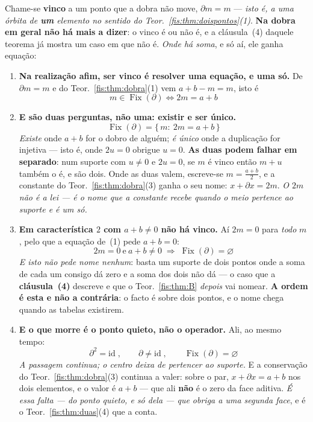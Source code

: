 \documentclass[livro.tex]{subfiles}
\begin{document}
\begin{teorema}\label{fis:thm:vinco}
Chame-se \textbf{vinco} a um ponto que a dobra não move, $\partial m=m$ ---
\emph{isto é, a uma órbita de \textbf{um} elemento no sentido do
Teor.~\ref{fis:thm:doispontos}(1)}. \textbf{Na dobra em geral não há mais a
dizer}: o vinco é ou não é, e a cláusula~(4) daquele teorema já mostra um caso em
que não é. \emph{Onde há soma}, e só aí, ele ganha equação:
\begin{enumerate}\itemsep3pt
\item[(1)] \textbf{Na realização afim, ser vinco é resolver uma equação, e uma
só.} De $\partial m=m$ e do Teor.~\ref{fis:thm:dobra}(1) vem $a+b-m=m$, isto é
\[
\boxed{\;m\in\operatorname{Fix}(\partial)\iff 2m=a+b\;}
\]
\item[(2)] \textbf{E são duas perguntas, não uma: existir e ser único.}
\[
\boxed{\;\operatorname{Fix}(\partial)=\{\,m:\ 2m=a+b\,\}\;}
\]
\emph{Existe} onde $a+b$ for o dobro de alguém; \emph{é único} onde a duplicação
for injetiva --- isto é, onde $2u=0$ obrigue $u=0$. \textbf{As duas podem falhar
em separado}: num suporte com $u\neq0$ e $2u=0$, se $m$ é vinco então $m+u$
também o é, e são dois. Onde as duas valem, escreve-se $m=\tfrac{a+b}{2}$, e a
constante do Teor.~\ref{fis:thm:dobra}(3) ganha o seu nome: $x+\partial x=2m$.
\emph{O $2m$ não é a lei --- é o nome que a constante recebe quando o meio
pertence ao suporte e é um só.}
\item[(3)] \textbf{Em característica $2$ com $a+b\neq0$ não há vinco.} Aí $2m=0$
para \emph{todo} $m$, pelo que a equação de~(1) pede $a+b=0$:
\[
\boxed{\;2m=0\ \text{e}\ a+b\neq0\;\Longrightarrow\;\operatorname{Fix}(\partial)=\varnothing\;}
\]
\emph{E isto não pede nome nenhum}: basta um suporte de dois pontos onde a soma
de cada um consigo dá zero e a soma dos dois não dá --- o caso que a
\textbf{cláusula~(4)} descreve e que o Teor.~\ref{fis:thm:B} \emph{depois} vai
nomear. \textbf{A ordem é esta e não a contrária}: o facto é sobre dois pontos, e
o nome chega quando as tabelas existirem.
\item[(4)] \textbf{E o que morre é o ponto quieto, não o operador.} Ali, ao mesmo
tempo:
\[
\boxed{\;\partial^{2}=\mathrm{id}\;,\qquad \partial\neq\mathrm{id}\;,\qquad
\operatorname{Fix}(\partial)=\varnothing\;}
\]
\emph{A passagem continua; o centro deixa de pertencer ao suporte.} E a
conservação do Teor.~\ref{fis:thm:dobra}(3) continua a valer: sobre o par,
$x+\partial x=a+b$ nos dois elementos, e o valor é $a+b$ --- que ali \textbf{não}
é o zero da face aditiva. \emph{É essa falta --- do ponto quieto, e só dela ---
que obriga a uma segunda face}, e é o Teor.~\ref{fis:thm:duas}(4) que a conta.
\end{enumerate}
\end{teorema}
\end{document}
